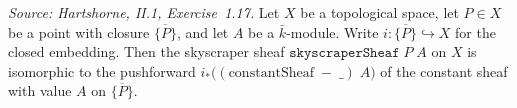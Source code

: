 \begin{lemma}

  \label{lem:skyscraperSheaf_eq_pushforward}
  \textit{Source: Hartshorne, II.1, Exercise~1.17.}
  Let \(X\) be a topological space, let \(P \in X\) be a point with
  closure \(\overline{\{P\}}\), and let \(A\) be a \(\bar k\)-module.
  Write \(i \colon \overline{\{P\}} \hookrightarrow X\) for the closed
  embedding. Then the skyscraper sheaf
  \(\mathtt{skyscraperSheaf}\;P\;A\) on \(X\) is isomorphic to the
  pushforward \(i_*\bigl((\mathrm{constantSheaf}\;{-}\;\_)\;A\bigr)\)
  of the constant sheaf with value \(A\) on \(\overline{\{P\}}\).

\end{lemma}

